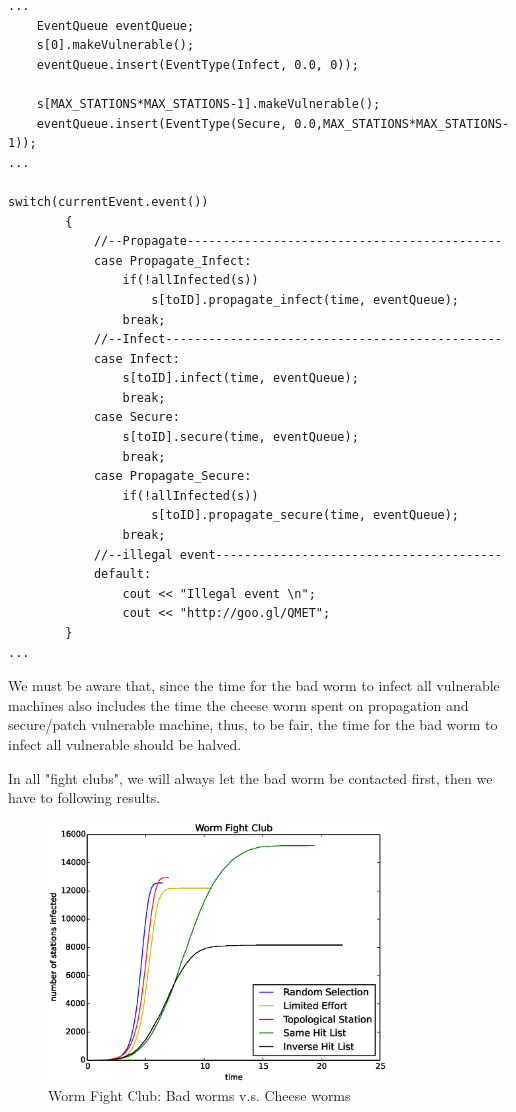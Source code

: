 \documentclass[10pt]{article}
\begin{document}
\begin{lstlisting}
...
	EventQueue eventQueue;
	s[0].makeVulnerable();
	eventQueue.insert(EventType(Infect, 0.0, 0));

	s[MAX_STATIONS*MAX_STATIONS-1].makeVulnerable();
	eventQueue.insert(EventType(Secure, 0.0,MAX_STATIONS*MAX_STATIONS-1));
...

switch(currentEvent.event())
		{
			//--Propagate--------------------------------------------
			case Propagate_Infect:
				if(!allInfected(s))
					s[toID].propagate_infect(time, eventQueue);
				break;
			//--Infect-----------------------------------------------
			case Infect:
				s[toID].infect(time, eventQueue);
				break;
			case Secure:
				s[toID].secure(time, eventQueue);
				break;
			case Propagate_Secure:
				if(!allInfected(s))
					s[toID].propagate_secure(time, eventQueue);
				break;
			//--illegal event----------------------------------------
			default:
				cout << "Illegal event \n";
				cout << "http://goo.gl/QMET";
		}
...
\end{lstlisting}

We must be aware that, since the time for the bad worm to infect all vulnerable machines also includes the time the cheese worm spent on propagation and secure/patch vulnerable machine, thus, to be fair, the time for the bad worm to infect all vulnerable should be halved.

In all "fight clubs", we will always let the bad worm be contacted first, then we have to following results. 

\begin{figure}[H]
\begin{center}
\includegraphics[width=0.8\textwidth]{figure6.1.eps}
\caption{Worm Fight Club: Bad worms v.s. Cheese worms}
\end{center}
\end{figure}
\end{document}

